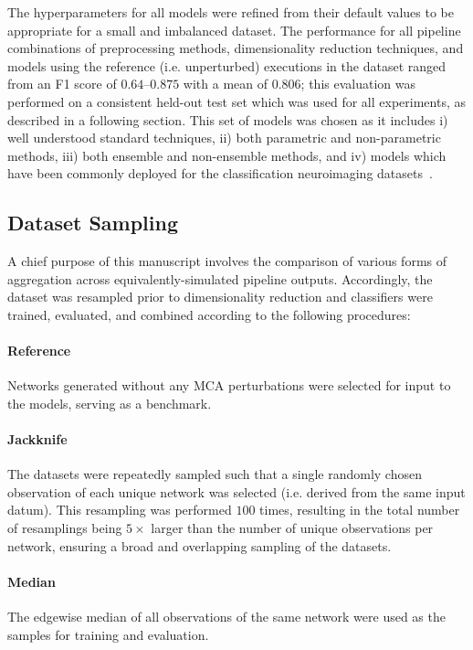 \documentclass[10pt]{SelfArx} %
\begin{document}
The hyperparameters for all models were refined from their default values to be appropriate for a small and imbalanced
dataset. The performance for all pipeline combinations of preprocessing methods, dimensionality reduction techniques,
and models using the reference (i.e. unperturbed) executions in the dataset ranged from an F1 score of $0.64 – 0.875$
with a mean of $0.806$; this evaluation was performed on a consistent held-out test set which was used for all
experiments, as described in a following section. This set of models was chosen as it includes i) well understood
standard techniques, ii) both parametric and non-parametric methods, iii) both ensemble and non-ensemble
methods, and iv) models which have been commonly deployed for the classification neuroimaging
datasets~\cite{Meier2012-ve,Tunc2016-cz, Zhu2018-cs,Payabvash2019-tm,Crossley2014-tg,Park2015-uj,Nayak2016-wl,Tolan2018-nq}.

\subsection*{Dataset Sampling}

A chief purpose of this manuscript involves the comparison of various forms of aggregation across
equivalently-simulated pipeline outputs. Accordingly, the dataset was resampled prior to dimensionality reduction and
classifiers were trained, evaluated, and combined according to the following procedures:

\paragraph{Reference} Networks generated without any MCA perturbations were selected for input to the models, serving
as a benchmark.

\paragraph{Jackknife} The datasets were repeatedly sampled such that a single randomly chosen observation of each
unique network was selected (i.e. derived from the same input datum). This resampling was performed $100$ times,
resulting in the total number of resamplings being $5\times$ larger than the number of unique observations per network,
ensuring a broad and overlapping sampling of the datasets.

\paragraph{Median} The edgewise median of all observations of the same network were used as the samples for training
and evaluation.
\end{document}
